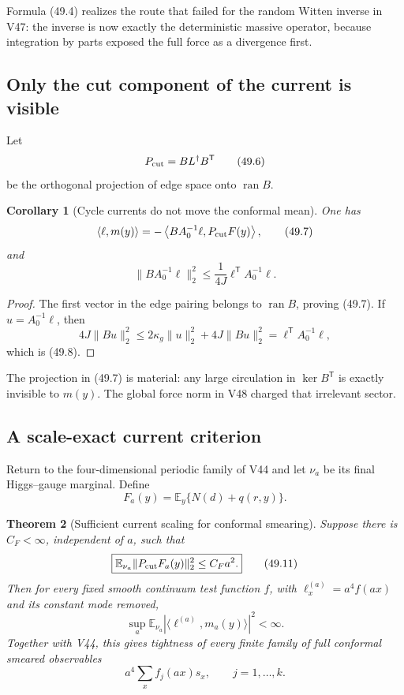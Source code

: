 \documentclass[11pt]{article}
\newtheorem{theorem}{Theorem}[section]
\newtheorem{corollary}[theorem]{Corollary}
\theoremstyle{remark}
\begin{document}
Formula (49.4) realizes the route that failed for the random Witten
inverse in V47: the inverse is now exactly the deterministic massive
operator, because integration by parts exposed the full force as a
divergence first.

\subsection{Only the cut component of the current is visible}

Let
\[
 P_{\rm cut}=BL^\dagger B^{\mathsf T}              \tag{49.6}
\]
be the orthogonal projection of edge space onto
\(\operatorname{ran}B\).

\begin{corollary}[Cycle currents do not move the conformal mean]
\label{cor:v17v49-cut}
One has
\[
 \langle\ell,m(y)\rangle
 =
 -\left\langle
 BA_0^{-1}\ell,P_{\rm cut}F(y)
 \right\rangle,                                   \tag{49.7}
\]
and
\[
 \|BA_0^{-1}\ell\|_2^2
 \leq
 \frac1{4J}\ell^{\mathsf T}A_0^{-1}\ell.          \tag{49.8}
\]
\end{corollary}

\begin{proof}
The first vector in the edge pairing belongs to
\(\operatorname{ran}B\), proving (49.7).  If
\(u=A_0^{-1}\ell\), then
\[
 4J\|Bu\|_2^2
 \leq
 2\kappa_g\|u\|_2^2+4J\|Bu\|_2^2
 =
 \ell^{\mathsf T}A_0^{-1}\ell,                   \tag{49.9}
\]
which is (49.8).
\end{proof}

The projection in (49.7) is material: any large circulation in
\(\ker B^{\mathsf T}\) is exactly invisible to \(m(y)\).  The global
force norm in V48 charged that irrelevant sector.

\subsection{A scale-exact current criterion}

Return to the four-dimensional periodic family of V44 and let
\(\nu_a\) be its final Higgs--gauge marginal.  Define
\[
 F_a(y)=
 \mathbb E_y\{N(d)+q(r,y)\}.                       \tag{49.10}
\]

\begin{theorem}[Sufficient current scaling for conformal smearing]
\label{thm:v17v49-criterion}
Suppose there is \(C_F<\infty\), independent of \(a\), such that
\[
\boxed{
 \mathbb E_{\nu_a}
 \|P_{\rm cut}F_a(y)\|_2^2
 \leq C_Fa^2.}                                    \tag{49.11}
\]
Then for every fixed smooth continuum test function \(f\), with
\(\ell_x^{(a)}=a^4f(ax)\) and its constant mode removed,
\[
 \sup_a
 \mathbb E_{\nu_a}
 |\langle\ell^{(a)},m_a(y)\rangle|^2
 <\infty.                                         \tag{49.12}
\]
Together with V44, this gives tightness of every finite family of
full conformal smeared observables
\[
 a^4\sum_x f_j(ax)s_x,\qquad j=1,\ldots,k.        \tag{49.13}
\]
\end{theorem}
\end{document}
